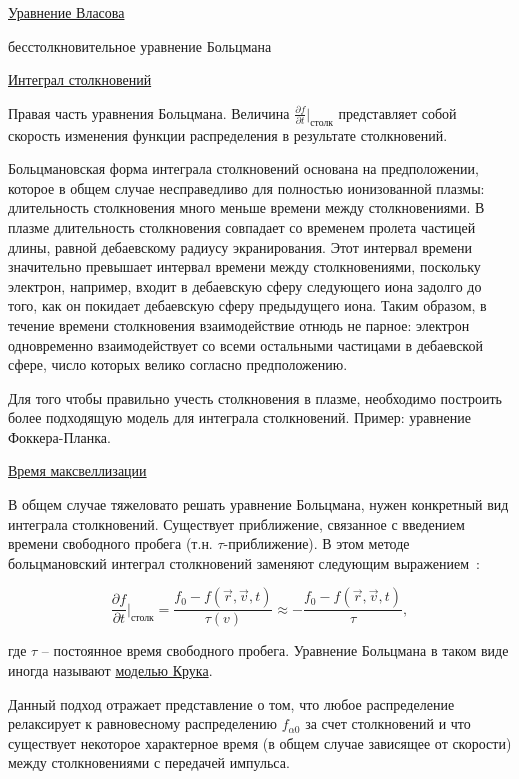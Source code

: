 \documentclass[10pt, a4paper]{article}
\numberwithin{equation}{section}
\begin{document}
\uline{Уравнение Власова}

бесстолкновительное уравнение Больцмана

\uline{Интеграл столкновений}

Правая часть уравнения Больцмана. Величина $\frac{\partial f}{\partial t}|_\text{столк}$ представляет собой скорость изменения функции
распределения в результате столкновений.

Больцмановская форма интеграла столкновений основана на  предположении, которое в общем случае несправедливо для полностью  ионизованной плазмы: длительность столкновения много меньше времени между столкновениями. В плазме длительность  столкновения совпадает со временем пролета частицей длины, равной дебаевскому радиусу экранирования. Этот интервал времени значительно превышает интервал времени между столкновениями, поскольку электрон, например, входит в дебаевскую сферу следующего иона задолго до того, как он  покидает дебаевскую сферу предыдущего иона. Таким образом, в течение времени столкновения взаимодействие отнюдь не парное: электрон одновременно взаимодействует со всеми остальными частицами в дебаевской сфере, число которых велико согласно предположению.

Для того чтобы правильно учесть столкновения в плазме, необходимо построить более подходящую модель для интеграла столкновений.  Пример: уравнение Фоккера-Планка.

\uline{Время максвеллизации}

В общем случае тяжеловато решать уравнение Больцмана, нужен конкретный вид интеграла столкновений. Существует приближение, связанное с введением времени свободного пробега (т.н. $\tau$-приближение). В этом
методе больцмановский интеграл столкновений заменяют следующим выражением~\cite{kroll}:

\begin{equation*}
	\frac{\partial f}{\partial t}|_\text{столк} = \frac{f_0-f(\vec{r}, \vec{v}, t)}{\tau(v)}\approx-\frac{f_0-f(\vec{r}, \vec{v}, t)}{\tau},
\end{equation*}

где $\tau$ -- постоянное время свободного пробега. Уравнение Больцмана в таком виде иногда называют \uline{моделью Крука}.

Данный подход отражает представление о том, что любое распределение
релаксирует к равновесному распределению $f_{\alpha 0}$ за счет столкновений и что
существует некоторое характерное время (в общем случае зависящее от скорости) между столкновениями с передачей импульса.
\end{document}
